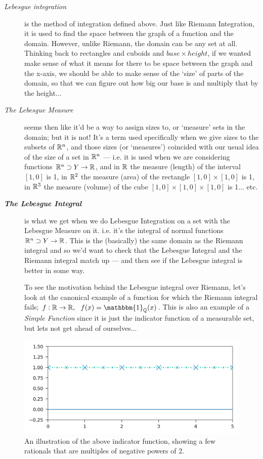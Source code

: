 \begin{description}
\item[\em Lebesgue integration\/] is the method of integration defined above. Just like Riemann Integration, it is used to find the space between the graph of a function and the domain. However, unlike Riemann, the domain can be any set at all. Thinking back to rectangles and cuboids and $base \times height$, if we wanted make sense of what it means for there to be space between the graph and the x-axis, we should be able to make sense of the `size' of parts of the domain, so that we can figure out how big our base is and multiply that by the height$\ldots$
%
\item[\em The Lebesgue Measure\/] seems then like it'd be a way to assign sizes to, or `measure' sets in the domain; but it is not! It's a term used specifically when we give sizes to the subsets of $\mathbb{R}^n$, and those sizes (or `measures') coincided with our usual idea of the size of a set in $\mathbb{R}^n$ --- i.e. it is used when we are considering functions $\mathbb{R}^n \supset Y \rightarrow \mathbb{R}$, and in $\mathbb{R}$ the measure (length) of the interval $[1, 0]$ is 1, in $\mathbb{R}^2$ the measure (area) of the rectangle $[1, 0] \times [1, 0]$ is 1, in $\mathbb{R}^3$ the measure (volume) of the cube $[1, 0] \times [1, 0] \times [1, 0]$ is 1$\ldots$ etc. 
%
\item[\bf \em The Lebesgue Integral\/] is what we get when we do Lebesgue Integration on a set with the Lebesgue Measure on it. i.e. it's the integral of normal functions $\mathbb{R}^n \supset Y \rightarrow \mathbb{R}$. This is the (basically) the same domain as the Riemann integral and so we'd want to check that the Lebesgue Integral and the Riemann integral match up --- and then see if the Lebesgue integral is better in some way.

To see the motivation behind the Lebesgue integral over Riemann, let's look at the canonical example of a function for which the Riemann integral fails; $f:\R \rightarrow \R,\ \ f(x) = \mathbbm{1}_\Q(x)$. This is also an example of a {\em Simple Function} since it is just the indicator function of a measurable set, but lets not get ahead of ourselves...
\end{description}
\begin{figure}[H]
	\centering
	\includegraphics[]{Code/Rational.png}
	\caption{An illustration of the above indicator function, showing a few rationals that are multiples of negative powers of 2.}
\end{figure}


